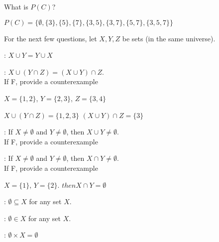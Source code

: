 \nextq
What is $P(C)$?
\begin{answerlong}
$P(C) = \{ \emptyset, \{3\}, \{5\}, \{7\}, \{3,5\}, \{3,7\}, \{5,7\}, \{3,5,7\} \}$
\end{answerlong}
For the next few questions, let $X, Y, Z$ be sets (in the same universe).

\nextq
\tf: $X \cup Y = Y \cup X$
\dotfill{}

\nextq
\tf: $X \cup (Y \cap Z) = (X \cup Y) \cap Z$.
\dotfill{}
\\
If F, provide a counterexample
\begin{answerlong}
$X = \{ 1 ,2\}$, $Y = \{ 2,3 \}$, $Z = \{ 3,4 \}$

$X \cup (Y \cap Z) = \{1,2,3\}$ 
$(X \cup Y) \cap Z = \{3\}$
\end{answerlong}

\nextq
\tf: If $X \neq \emptyset$ and $Y \neq \emptyset$, then 
$X \cup Y \neq \emptyset$.
\dotfill{}
\\
If F, provide a counterexample
\begin{answerlong}

\end{answerlong}

\nextq
\tf: If $X \neq \emptyset$ and $Y \neq \emptyset$, then 
$X \cap Y \neq \emptyset$.
\dotfill{}
\\
If F, provide a counterexample
\begin{answerlong}
$X = \{ 1 \}$, $Y = \{ 2 \}$.  $then X \cap Y = \emptyset$
\end{answerlong}

\nextq
\tf: $\emptyset \subseteq X$ for any set $X$.
\dotfill{}

\nextq
\tf: $\emptyset \in X$ for any set $X$.
\dotfill{}

\nextq
\tf: $\emptyset \times X = \emptyset$
\dotfill{}

